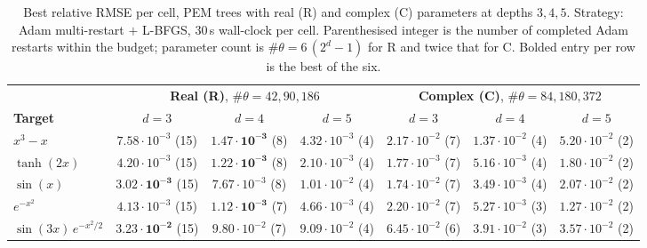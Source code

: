 \begin{table}[t]
  \centering
  \caption{Best relative RMSE per cell, PEM trees with real (R) and complex (C)
  parameters at depths $3, 4, 5$. Strategy: Adam multi-restart $+$ L-BFGS,
  $30\,$s wall-clock per cell. Parenthesised integer is the number of
  completed Adam restarts within the budget; parameter count is
  $\#\theta = 6\,(2^d - 1)$ for R and twice that for C. Bolded entry per row
  is the best of the six.}
  \label{tab:pem_universality}
  \small
  \setlength{\tabcolsep}{3.5pt}
  \begin{tabular}{l|ccc|ccc}
    \toprule
    & \multicolumn{3}{c|}{\textbf{Real (R)}, $\#\theta = 42, 90, 186$}
    & \multicolumn{3}{c}{\textbf{Complex (C)}, $\#\theta = 84, 180, 372$} \\
    \textbf{Target} & $d{=}3$ & $d{=}4$ & $d{=}5$ & $d{=}3$ & $d{=}4$ & $d{=}5$ \\
    \midrule
    $x^3 - x$ & $7.58\!\cdot\!10^{-3}$ \scriptsize(15) & $\mathbf{1.47\!\cdot\!10^{-3}}$ \scriptsize(8) & $4.32\!\cdot\!10^{-3}$ \scriptsize(4) & $2.17\!\cdot\!10^{-2}$ \scriptsize(7) & $1.37\!\cdot\!10^{-2}$ \scriptsize(4) & $5.20\!\cdot\!10^{-2}$ \scriptsize(2) \\
    $\tanh(2x)$ & $4.20\!\cdot\!10^{-3}$ \scriptsize(15) & $\mathbf{1.22\!\cdot\!10^{-3}}$ \scriptsize(8) & $2.10\!\cdot\!10^{-3}$ \scriptsize(4) & $1.77\!\cdot\!10^{-3}$ \scriptsize(7) & $5.16\!\cdot\!10^{-3}$ \scriptsize(4) & $1.80\!\cdot\!10^{-2}$ \scriptsize(2) \\
    $\sin(x)$ & $\mathbf{3.02\!\cdot\!10^{-3}}$ \scriptsize(15) & $7.67\!\cdot\!10^{-3}$ \scriptsize(8) & $1.01\!\cdot\!10^{-2}$ \scriptsize(4) & $1.74\!\cdot\!10^{-2}$ \scriptsize(7) & $3.49\!\cdot\!10^{-3}$ \scriptsize(4) & $2.07\!\cdot\!10^{-2}$ \scriptsize(2) \\
    $e^{-x^2}$ & $4.13\!\cdot\!10^{-3}$ \scriptsize(15) & $\mathbf{1.12\!\cdot\!10^{-3}}$ \scriptsize(7) & $4.66\!\cdot\!10^{-3}$ \scriptsize(4) & $2.20\!\cdot\!10^{-2}$ \scriptsize(7) & $5.27\!\cdot\!10^{-3}$ \scriptsize(3) & $1.27\!\cdot\!10^{-2}$ \scriptsize(2) \\
    $\sin(3x)\,e^{-x^2/2}$ & $\mathbf{3.23\!\cdot\!10^{-2}}$ \scriptsize(15) & $9.80\!\cdot\!10^{-2}$ \scriptsize(7) & $9.09\!\cdot\!10^{-2}$ \scriptsize(4) & $6.45\!\cdot\!10^{-2}$ \scriptsize(6) & $3.91\!\cdot\!10^{-2}$ \scriptsize(3) & $3.57\!\cdot\!10^{-2}$ \scriptsize(2) \\
    \bottomrule
  \end{tabular}
\end{table}
